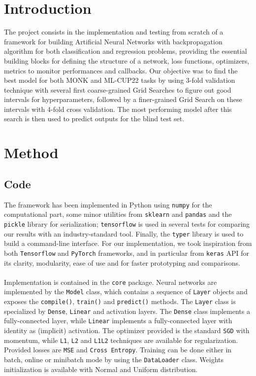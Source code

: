 \section{Introduction}

The project consists in the implementation and testing from scratch of a framework for building Artificial Neural Networks with backpropagation algorithm for both classification and regression problems, providing the essential building blocks for defining the structure of a network, loss functions, optimizers, metrics to monitor performances and callbacks. Our objective was to find the best model for both MONK and ML-CUP22 tasks by using 3-fold validation technique with several first coarse-grained Grid Searches to figure out good intervals for hyperparameters, followed by a finer-grained Grid Search on these intervals with 4-fold cross validation. The most performing model after this search is then used to predict outputs for the blind test set.

\section{Method}

\subsection{Code}

The framework has been implemented in Python using \texttt{numpy} for the computational part, some minor utilities from \texttt{sklearn} and \texttt{pandas} and the \texttt{pickle} library for serialization; \texttt{tensorflow} is used in several tests for comparing our results with an industry-standard tool.
Finally, the \texttt{typer} library is used to build a command-line interface.
For our implementation, we took inspiration from both \texttt{Tensorflow} and \texttt{PyTorch} frameworks, and in particular from \texttt{keras} API for its clarity, modularity, ease of use and for faster prototyping and comparisons.

\paragraph{}

Implementation is contained in the \texttt{core} package. Neural networks are implemented by the \texttt{Model} class, which contains a sequence of \texttt{Layer} objects and exposes the \texttt{compile()}, \texttt{train()} and \texttt{predict()} methods. The \texttt{Layer} class is specialized by \texttt{Dense}, \texttt{Linear} and activation layers. The \texttt{Dense} class implements a fully-connected layer, while \texttt{Linear} implements a fully-connected layer with identity as (implicit) activation.
The optimizer provided is the standard \texttt{SGD} with momentum, while \texttt{L1}, \texttt{L2} and \texttt{L1L2} techniques are available for regularization. Provided losses are \texttt{MSE} and \texttt{Cross Entropy}. Training can be done either in batch, online or minibatch mode by using the \texttt{DataLoader} class. Weights initialization is available with Normal and Uniform distribution.

